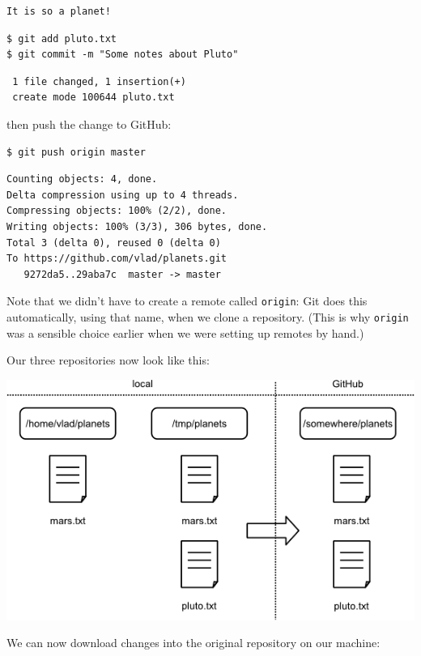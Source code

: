 \documentclass[]{book}
\begin{document}
\begin{verbatim}
It is so a planet!
\end{verbatim}

\begin{verbatim}
$ git add pluto.txt
$ git commit -m "Some notes about Pluto"
\end{verbatim}

\begin{verbatim}
 1 file changed, 1 insertion(+)
 create mode 100644 pluto.txt
\end{verbatim}

then push the change to GitHub:

\begin{verbatim}
$ git push origin master
\end{verbatim}

\begin{verbatim}
Counting objects: 4, done.
Delta compression using up to 4 threads.
Compressing objects: 100% (2/2), done.
Writing objects: 100% (3/3), 306 bytes, done.
Total 3 (delta 0), reused 0 (delta 0)
To https://github.com/vlad/planets.git
   9272da5..29aba7c  master -> master
\end{verbatim}

Note that we didn't have to create a remote called \texttt{origin}: Git
does this automatically, using that name, when we clone a repository.
(This is why \texttt{origin} was a sensible choice earlier when we were
setting up remotes by hand.)

Our three repositories now look like this:

\includegraphics{novice/git/img/git-after-change-to-duplicate-repo.png}

We can now download changes into the original repository on our machine:
\end{document}
